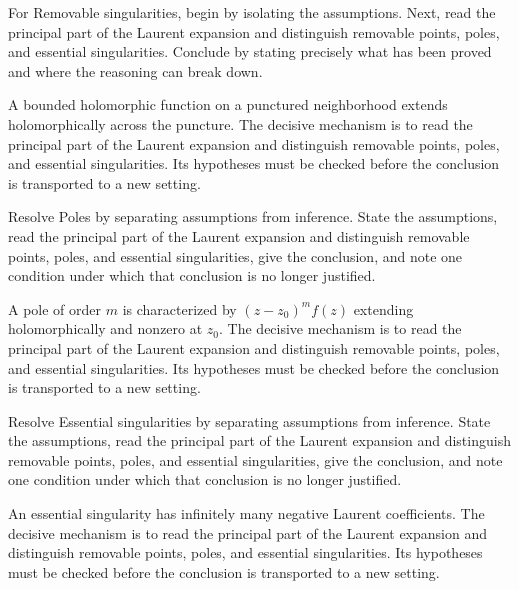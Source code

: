 \begin{problem}\label{prob:iv09-problem-01}
For Removable singularities, begin by isolating the assumptions. Next, read the principal part of the Laurent expansion and distinguish removable points, poles, and essential singularities. Conclude by stating precisely what has been proved and where the reasoning can break down.
\end{problem}
\begin{solution}
A bounded holomorphic function on a punctured neighborhood extends holomorphically across the puncture. The decisive mechanism is to read the principal part of the Laurent expansion and distinguish removable points, poles, and essential singularities. Its hypotheses must be checked before the conclusion is transported to a new setting.
\end{solution}

\begin{problem}\label{prob:iv09-problem-02}
Resolve Poles by separating assumptions from inference. State the assumptions, read the principal part of the Laurent expansion and distinguish removable points, poles, and essential singularities, give the conclusion, and note one condition under which that conclusion is no longer justified.
\end{problem}
\begin{solution}
A pole of order $m$ is characterized by $(z-z_0)^mf(z)$ extending holomorphically and nonzero at $z_0$. The decisive mechanism is to read the principal part of the Laurent expansion and distinguish removable points, poles, and essential singularities. Its hypotheses must be checked before the conclusion is transported to a new setting.
\end{solution}

\begin{problem}\label{prob:iv09-problem-03}
Resolve Essential singularities by separating assumptions from inference. State the assumptions, read the principal part of the Laurent expansion and distinguish removable points, poles, and essential singularities, give the conclusion, and note one condition under which that conclusion is no longer justified.
\end{problem}
\begin{solution}
An essential singularity has infinitely many negative Laurent coefficients. The decisive mechanism is to read the principal part of the Laurent expansion and distinguish removable points, poles, and essential singularities. Its hypotheses must be checked before the conclusion is transported to a new setting.
\end{solution}

